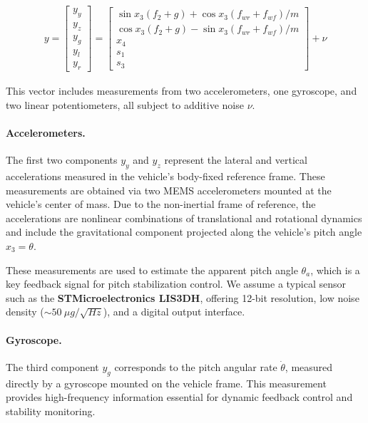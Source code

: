\documentclass[]{report}
\begin{document}
	\begin{align}
		y = \begin{bmatrix}
			y_y \\ y_z \\ y_g \\ y_l \\ y_r
		\end{bmatrix} =
		\begin{bmatrix}
			\sin x_3(f_2 + g) + \cos x_3(f_{wr} + f_{wf})/m \\
			\cos x_3(f_2 + g) - \sin x_3(f_{wr} + f_{wf})/m \\
			x_4 \\
			s_1 \\
			s_3
		\end{bmatrix} + \nu
	\end{align}
	
	This vector includes measurements from two accelerometers, one gyroscope, and two linear potentiometers, all subject to additive noise $\nu$.
	
	\paragraph{Accelerometers.}
	The first two components $y_y$ and $y_z$ represent the lateral and vertical accelerations measured in the vehicle’s body-fixed reference frame. These measurements are obtained via two MEMS accelerometers mounted at the vehicle's center of mass. Due to the non-inertial frame of reference, the accelerations are nonlinear combinations of translational and rotational dynamics and include the gravitational component projected along the vehicle's pitch angle $x_3 = \theta$.
	
	These measurements are used to estimate the apparent pitch angle $\theta_a$, which is a key feedback signal for pitch stabilization control. We assume a typical sensor such as the \textbf{STMicroelectronics LIS3DH}, offering 12-bit resolution, low noise density ($\sim50~\mu g/\sqrt{Hz}$), and a digital output interface.
	
	\paragraph{Gyroscope.}
	The third component $y_g$ corresponds to the pitch angular rate $\dot{\theta}$, measured directly by a gyroscope mounted on the vehicle frame. This measurement provides high-frequency information essential for dynamic feedback control and stability monitoring.
	
\end{document}
